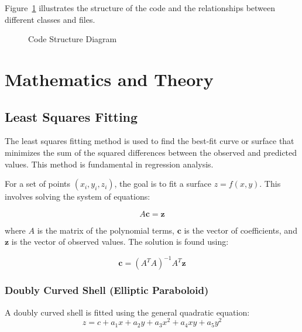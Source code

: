 \documentclass[12pt]{article}
\begin{document}
Figure~\ref{fig:code-structure} illustrates the structure of the code and the relationships between different classes and files.

\begin{figure}[h]
    \centering
    \caption{Code Structure Diagram}
    \label{fig:code-structure}
\end{figure}

\section{Mathematics and Theory}

\subsection{Least Squares Fitting}
The least squares fitting method is used to find the best-fit curve or surface that minimizes the sum of the squared differences between the observed and predicted values. This method is fundamental in regression analysis.

For a set of points \((x_i, y_i, z_i)\), the goal is to fit a surface \(z = f(x, y)\). This involves solving the system of equations:

\[
A \mathbf{c} = \mathbf{z}
\]

where \(A\) is the matrix of the polynomial terms, \(\mathbf{c}\) is the vector of coefficients, and \(\mathbf{z}\) is the vector of observed values. The solution is found using:

\[
\mathbf{c} = (A^T A)^{-1} A^T \mathbf{z}
\]

\subsubsection{Doubly Curved Shell (Elliptic Paraboloid)}
A doubly curved shell is fitted using the general quadratic equation:
\[
z = c + a_1 x + a_2 y + a_3 x^2 + a_4 xy + a_5 y^2
\]
\end{document}
